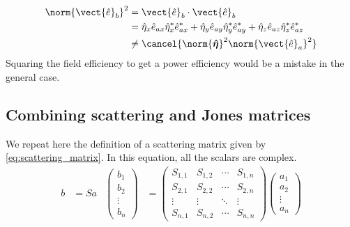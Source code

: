 \begin{subequations}
    \begin{align*}
        \norm{\vect{\hat{e}}_b}^2
        &=
        \vect{\hat{e}}_b \cdot \vect{\hat{e}}_b
        \\
        &=
        \hat{\eta}_x \hat{e}_{ax} \hat{\eta}^*_x \hat{e}^*_{ax} +
        \hat{\eta}_y \hat{e}_{ay} \hat{\eta}^*_y \hat{e}^*_{ay} +
        \hat{\eta}_z \hat{e}_{az} \hat{\eta}^*_z \hat{e}^*_{az}
        \\
        &\neq
        \cancel{
            \norm{\boldsymbol{\hat{\eta}}}^2
            \norm{\vect{\hat{e}}_a}^2
        }
    \end{align*}
\end{subequations}
Squaring the field efficiency to get a power efficiency would be a mistake in the general case.


\subsection{Combining scattering and Jones matrices}
We repeat here the definition of a scattering matrix given by \vref{eq:scattering_matrix}.
In this equation, all the scalars are complex.
\begin{align*}
    b &= S a
    &
    \begin{pmatrix}
        b_1\\
        b_2\\
        \vdots\\
        b_n
    \end{pmatrix}
    &=
    \begin{pmatrix}
        S_{1, 1} & S_{1, 2} & \cdots & S_{1, n} \\
        S_{2, 1} & S_{2, 2} & \cdots & S_{2, n} \\
        \vdots   & \vdots   & \ddots & \vdots   \\
        S_{n, 1} & S_{n, 2} & \cdots & S_{n, n}
    \end{pmatrix}
    \begin{pmatrix}
        a_1\\
        a_2\\
        \vdots\\
        a_n
    \end{pmatrix}
\end{align*}

